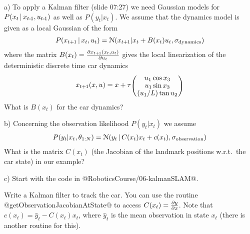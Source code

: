 a) To apply a Kalman filter (slide 07:27) we need Gaussian models for
$P(x_t \,|\, x_{t{{\hspace*{-.0pt}\text{\rm -}\hspace*{-.5pt}}1}}, u_{t{{\hspace*{-.0pt}\text{\rm -}\hspace*{-.5pt}}1}})$ as well as $P(y_t | x_t)$.  We assume
that the dynamics model is given as a local Gaussian of the form
\begin{align*}
P(x_{t{{\hspace*{-.0pt}\text{\rm +}\hspace*{-.5pt}}1}} \,|\, x_t, u_t) = {\cal N}(x_{t{{\hspace*{-.0pt}\text{\rm +}\hspace*{-.5pt}}1}} | x_t + B(x_t) u_t, \sigma_\text{dynamics} )
\end{align*}
where the matrix $B(x_t) = \frac{\partial x_{t{{\hspace*{-.0pt}\text{\rm +}\hspace*{-.5pt}}1}}(x_t,u_t)}{\partial u_t}$
gives the local linearization of the deterministic discrete time car dynamics
$$x_{t\po}(x,u) = x + \tau \mat{c}{u_1 \cos x_3 \\ u_1 \sin x_3 \\ (u_1/L) \tan u_2}$$
What is $B(x_t)$ for the car dynamics?

b) Concerning the observation likelihood $P(y_t | x_t)$ we assume
\begin{align*}
P(y_t | x_t, \theta_{1:N}) = {\cal N}(y_t \,|\, C(x_t) x_t + c(x_t), \sigma_\text{observation})
\end{align*}
What is the matrix $C(x_t)$ (the Jacobian of the landmark positions
w.r.t.\ the car state) in our example?

c) Start with the code in @RoboticsCourse/06-kalmanSLAM@.

Write a Kalman filter to track the car. You can use the
routine @getObservationJacobianAtState@ to
access $C(x_t)=\frac{\partial y}{\partial x}$. Note that $c(x_t) = \hat y_t
- C(x_t) x_t$, where $\hat y_t$ is the mean observation in state
$x_t$ (there is another routine for this).


\exerfoot



